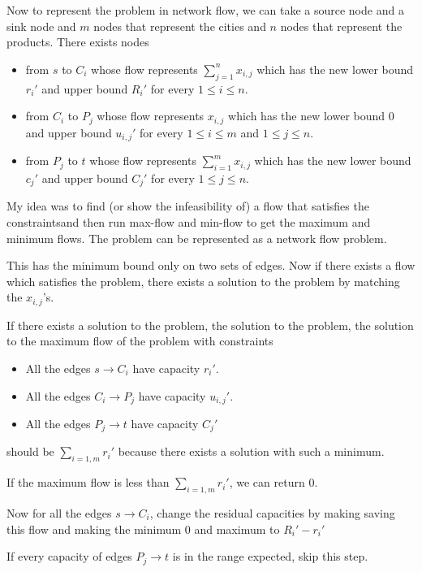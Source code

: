 \documentclass{article}
\begin{document}
Now to represent the problem in network flow, we can take a source node and a sink node and $m$ nodes that represent the cities and $n$ nodes that represent the products. There exists nodes

\begin{itemize}
    \item from $s$ to $C_i$ whose flow represents $\sum_{j=1}^n x_{i, j}$ which has the new lower bound $r_i'$ and upper bound $R_i'$ for every $1 \le i \le n$.
    \item from $C_i$ to $P_j$ whose flow represents $x_{i, j}$ which has the new lower bound $0$ and upper bound $u_{i, j}'$ for every $1 \le i \le m$ and $1 \le j \le n$.
    \item from $P_j$ to $t$ whose flow represents $\sum_{i=1}^m x_{i, j}$ which has the new lower bound $c_j'$ and upper bound $C_j'$ for every $1 \le j \le n$.
\end{itemize}

My idea was to find (or show the infeasibility of) a flow that satisfies the constraintsand then run max-flow and min-flow to get the maximum and minimum flows. The problem can be represented as a network flow problem.

This has the minimum bound only on two sets of edges. Now if there exists a flow which satisfies the problem, there exists a solution to the problem by matching the $x_{i, j}$'s.

If there exists a solution to the problem, the solution to the problem, the solution to the maximum flow of the problem with constraints \begin{itemize}
    \item All the edges $s \rightarrow C_i$ have capacity $r_i'$.
    \item All the edges $C_i \rightarrow P_j$ have capacity $u_{i, j}'$.
    \item All the edges $P_j \rightarrow t$ have capacity $C_j'$
\end{itemize} should be $\sum_{i=1,m} r_i'$ because there exists a solution with such a minimum.

If the maximum flow is less than $\sum_{i=1,m} r_i'$, we can return 0.

Now for all the edges $s \rightarrow C_i$, change the residual capacities by making saving this flow and making the minimum $0$ and maximum to $R_i' - r_i'$

If every capacity of edges $P_j \rightarrow t$ is in the range expected, skip this step.
\end{document}
